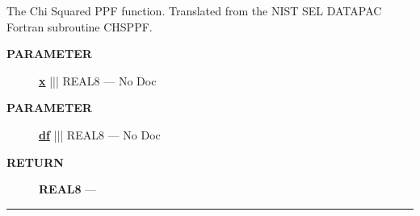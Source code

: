 The Chi Squared PPF function. Translated from the NIST SEL DATAPAC Fortran subroutine CHSPPF.






\par
\begin{description}
\item [\colorbox{tagtype}{\color{white} \textbf{\textsf{PARAMETER}}}] \textbf{\underline{x}} ||| REAL8 --- No Doc
\item [\colorbox{tagtype}{\color{white} \textbf{\textsf{PARAMETER}}}] \textbf{\underline{df}} ||| REAL8 --- No Doc
\end{description}







\par
\begin{description}
\item [\colorbox{tagtype}{\color{white} \textbf{\textsf{RETURN}}}] \textbf{REAL8} --- 
\end{description}




\rule{\linewidth}{0.5pt}


